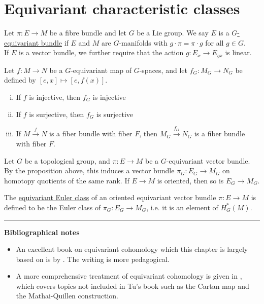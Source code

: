 \section{Equivariant characteristic classes}
\begin{defn} %
	Let $\pi: E\to M$ be a fibre bundle and let $G$ be a Lie group. We say $E$
	is a \underline{$G$-equivariant bundle} if $E$ and  $M$ are 
	$G$-manifolds  with $g \cdot \pi = \pi \cdot g$ for all  $g\in G$.\\
	If  $E$ is a vector bundle, we further require that the action  $g: E_x \to
	E_{gx}$ is linear.
\end{defn}

\begin{prop} %
	Let $f:M\to N$ be a $G$-equivariant map of  $G$-spaces, and let
	$f_G:M_G\to N_G$ be defined by $[e,x]\mapsto [e,f(x)]$. 
	\begin{enumerate}[(i)]
	    \item If $f$ is injective, then $f_G$ is injective
		\item If $f$ is surjective, then $f_G$ is surjective
		\item If $M\xrightarrow{f} N$ is a fiber bundle with fiber $F$, then
			$M_G\xrightarrow{f_G}N_G$ is a fiber bundle with fiber  $F$. 	
	\end{enumerate}
\end{prop}

Let $G$ be a topological group, and  $\pi : E\to M$ be a  $G$-equivariant vector
bundle. By the proposition above, this induces a vector bundle  $\pi_G : E_G\to
M_G$ on homotopy quotients of the same rank. If $E\to M$ is oriented, then so is
$E_G \to M_G$. 

The \underline{equivariant Euler class} of an oriented equivariant vector bundle
$\pi : E \to M$ is defined to be the Euler class of $\pi_G : E_G \to M_G$, i.e.
it is an element of $H_G^*(M)$. 

\vspace{5mm}
\hrule 
\vspace{5mm}

\textbf{Bibliographical notes}
{\small
\begin{itemize}
	\item An excellent book on equivariant cohomology which this chapter is
	largely based on is  by
	\citet{equivariant_tu}. The writing is more pedagogical. 
	\item A more comprehensive treatment of equivariant cohomology is given in
	\citet{guillemin}, which covers topics not included in Tu's book such as 
	the Cartan map and the Mathai-Quillen construction. 
\end{itemize}
}

